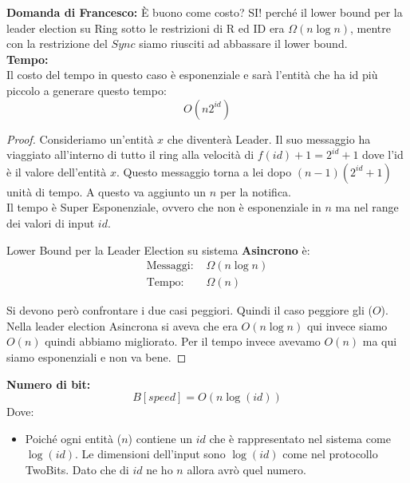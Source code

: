 \textbf{Domanda di Francesco:}
È buono come costo? SI! perché il lower bound per la leader election su Ring
sotto le restrizioni di R ed ID era $\Omega(n \log n)$, mentre con la
restrizione del $Sync$ siamo riusciti ad abbassare il lower bound.\\

\textbf{Tempo:}\\
Il costo del tempo in questo caso è esponenziale e sarà l'entità che ha id più
piccolo a generare questo tempo: $$O(n 2^{id})$$

\begin{proof}
    Consideriamo
    un'entità $x$ che diventerà Leader. Il suo messaggio ha viaggiato all'interno di
    tutto il ring alla velocità di $f(id)+1 = 2^{id}+1$ dove l'id è il valore
    dell'entità $x$. Questo messaggio torna a lei dopo $(n-1)(2^{id}+1)$ unità di
    tempo. A questo va aggiunto un $n$ per la notifica.\\
    Il tempo è Super Esponenziale, ovvero che non è esponenziale in $n$ ma nel range
    dei valori di input $id$.\\

    \begin{center}
        Lower Bound per la Leader Election su sistema \textbf{Asincrono} è:
        \begin{equation*}
            \begin{split}
                \text{Messaggi: } & \Omega(n \log n)\\
                \text{Tempo: } & \Omega(n)
            \end{split}
        \end{equation*}
    \end{center}

    Si devono però confrontare i due casi peggiori. Quindi il caso peggiore gli
    ($O$). Nella leader election Asincrona si aveva che era $O(n \log n)$ qui invece
    siamo $O(n)$ quindi abbiamo migliorato. Per il tempo invece avevamo $O(n)$ ma
    qui siamo esponenziali e non va bene.
\end{proof}

\textbf{Numero di bit:} $$B[speed] = O(n \log(id))$$ Dove:
\begin{itemize}
    \item Poiché ogni entità ($n$) contiene un $id$ che è rappresentato nel
          sistema come $\log(id)$. Le dimensioni dell'input sono $\log(id)$ come nel
          protocollo TwoBits. Dato che di $id$ ne ho $n$ allora avrò quel numero.
\end{itemize}

